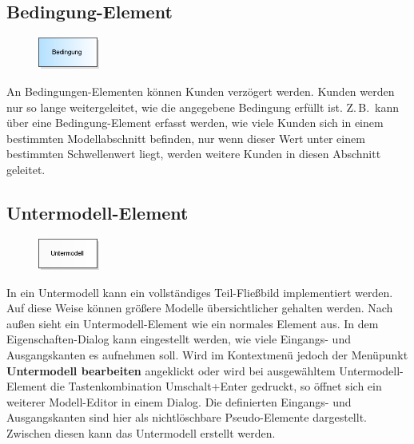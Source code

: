 \documentclass[deutsch]{svmono}
\begin{document}
\subsection*{Bedingung-Element}

\begin{figure}
\vspace{-22pt}
\includegraphics[width=2cm]{IconCondition.png}
\vspace{-22pt}
\end{figure}
An Bedingungen-Elementen können Kunden verzögert werden. Kunden werden nur so lange weitergeleitet, wie die angegebene Bedingung erfüllt ist. Z.\,B.\ kann über eine Bedingung-Element erfasst werden, wie viele Kunden sich in einem bestimmten Modellabschnitt befinden, nur wenn dieser Wert unter einem bestimmten Schwellenwert liegt, werden weitere Kunden in diesen Abschnitt geleitet.

\subsection*{Untermodell-Element}

\begin{figure}
\vspace{-22pt}
\includegraphics[width=2cm]{IconSubModel.png}
\vspace{-22pt}
\end{figure}
In ein Untermodell kann ein vollständiges Teil-Fließbild implementiert werden. Auf diese Weise können größere Modelle übersichtlicher gehalten werden. Nach außen sieht ein Untermodell-Element wie ein normales Element aus. In dem Eigenschaften-Dialog kann eingestellt werden, wie viele Eingangs- und Ausgangskanten es aufnehmen soll. Wird im Kontextmenü jedoch der Menüpunkt \textbf{Untermodell bearbeiten} angeklickt oder wird bei ausgewähltem Untermodell-Element die Tastenkombination Umschalt+Enter gedruckt, so öffnet sich ein weiterer Modell-Editor in einem Dialog. Die definierten Eingangs- und Ausgangskanten sind hier als nichtlöschbare Pseudo-Elemente dargestellt. Zwischen diesen kann das Untermodell erstellt werden.
\end{document}
